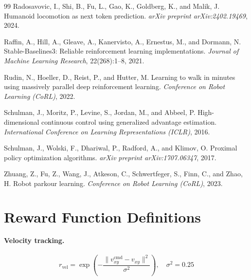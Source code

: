 \documentclass{article}
\begin{document}
\begin{thebibliography}{99}
Radosavovic, I., Shi, B., Fu, L., Gao, K., Goldberg, K., and Malik, J.
\newblock Humanoid locomotion as next token prediction.
\newblock \emph{arXiv preprint arXiv:2402.19469}, 2024.

Raffin, A., Hill, A., Gleave, A., Kanervisto, A., Ernestus, M., and
Dormann, N.
\newblock Stable-Baselines3: Reliable reinforcement learning implementations.
\newblock \emph{Journal of Machine Learning Research}, 22(268):1--8, 2021.

Rudin, N., Hoeller, D., Reist, P., and Hutter, M.
\newblock Learning to walk in minutes using massively parallel deep
reinforcement learning.
\newblock \emph{Conference on Robot Learning (CoRL)}, 2022.

Schulman, J., Moritz, P., Levine, S., Jordan, M., and Abbeel, P.
\newblock High-dimensional continuous control using generalized advantage
estimation.
\newblock \emph{International Conference on Learning Representations (ICLR)},
2016.

Schulman, J., Wolski, F., Dhariwal, P., Radford, A., and Klimov, O.
\newblock Proximal policy optimization algorithms.
\newblock \emph{arXiv preprint arXiv:1707.06347}, 2017.

Zhuang, Z., Fu, Z., Wang, J., Atkeson, C., Schwertfeger, S., Finn, C.,
and Zhao, H.
\newblock Robot parkour learning.
\newblock \emph{Conference on Robot Learning (CoRL)}, 2023.

\end{thebibliography}

\appendix

\section{Reward Function Definitions}
\label{app:rewards}

\paragraph{Velocity tracking.}
\[
  r_\text{vel} = \exp\!\left(-\frac{\|v_{xy}^\text{cmd} - v_{xy}\|^2}{\sigma^2}\right),
  \quad \sigma^2 = 0.25
\]
\end{document}
